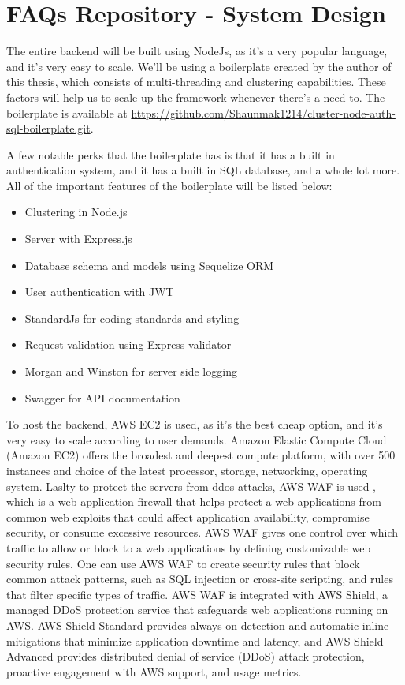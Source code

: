 \section{FAQs Repository - System Design}
The entire backend will be built using NodeJs, as it's a very popular language, and it's very easy to scale. We'll be using a boilerplate created by the author of this thesis, which consists of multi-threading and clustering capabilities. These factors will help us to scale up the framework whenever there's a need to. The boilerplate is available at \url{https://github.com/Shaunmak1214/cluster-node-auth-sql-boilerplate.git}. 

A few notable perks that the boilerplate has is that it has a built in authentication system, and it has a built in SQL database, and a whole lot more. All of the important features of the boilerplate will be listed below:

\begin{itemize}
  \item {Clustering in Node.js}
  \item {Server with Express.js}
  \item {Database schema and models using Sequelize ORM}
  \item {User authentication with JWT}
  \item {StandardJs for coding standards and styling}
  \item {Request validation using Express-validator}
  \item {Morgan and Winston for server side logging}
  \item {Swagger for API documentation}
\end{itemize}

To host the backend, AWS EC2 is used, as it's the best cheap option, and it's very easy to scale according to user demands. Amazon Elastic Compute Cloud (Amazon EC2) offers the broadest and deepest compute platform, with over 500 instances and choice of the latest processor, storage, networking, operating system. Laslty to protect the servers from ddos attacks, AWS WAF is used , which is a web application firewall that helps protect a web applications from common web exploits that could affect application availability, compromise security, or consume excessive resources. AWS WAF gives one control over which traffic to allow or block to a web applications by defining customizable web security rules. One can use AWS WAF to create security rules that block common attack patterns, such as SQL injection or cross-site scripting, and rules that filter specific types of traffic. AWS WAF is integrated with AWS Shield, a managed DDoS protection service that safeguards web applications running on AWS. AWS Shield Standard provides always-on detection and automatic inline mitigations that minimize application downtime and latency, and AWS Shield Advanced provides distributed denial of service (DDoS) attack protection, proactive engagement with AWS support, and usage metrics.


